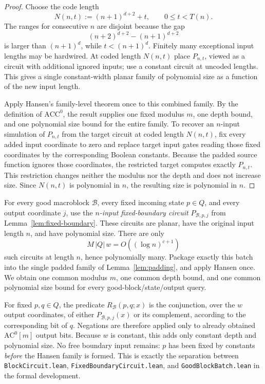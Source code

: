 \documentclass[11pt]{article}
\theoremstyle{definition}
\newcommand{\ACC}{\mathrm{ACC}^{0}}
\newcommand{\ACm}[1]{\mathrm{AC}^{0}[#1]}
\newcommand{\cB}{\mathcal{B}}
\begin{document}
\begin{proof}
Choose the code length
\[
  N(n,t):=(n+1)^{d+2}+t,
  \qquad 0\le t<T(n).
\]
The ranges for consecutive $n$ are disjoint because the gap
\[
  (n+2)^{d+2}-(n+1)^{d+2}
\]
is larger than $(n+1)^d$, while $t<(n+1)^d$.  Finitely many exceptional input lengths may be hardwired.  At coded length $N(n,t)$ place
$P_{n,t}$, viewed as a circuit with additional ignored inputs; use a constant
circuit at uncoded lengths.  This gives a single constant-width planar family
of polynomial size as a function of the new input length.

Apply Hansen's family-level theorem once to this combined family.  By the
definition of $\ACC$, the result supplies one fixed modulus $m$, one depth
bound, and one polynomial size bound for the entire family.  To recover an
$n$-input simulation of $P_{n,t}$ from the target circuit at coded length
$N(n,t)$, fix every added input coordinate to zero and replace target input
gates reading those fixed coordinates by the corresponding Boolean constants.
Because the padded source function ignores those coordinates, the restricted
target computes exactly $P_{n,t}$.  This restriction changes neither the
modulus nor the depth and does not increase size.  Since $N(n,t)$ is polynomial
in $n$, the resulting size is polynomial in $n$.
\end{proof}

For every good macroblock $\cB$, every fixed incoming state $p\in Q$, and
every output coordinate $j$, use the \emph{$n$-input fixed-boundary circuit}
$P_{\cB,p,j}$ from Lemma~\ref{lem:fixed-boundary}.  These circuits are planar,
have the original input length $n$, and have polynomial size.  There are only
\[
  M\,|Q|\,w=O((\log n)^{c+1})
\]
such circuits at length $n$, hence polynomially many.  Package exactly this
batch into the single padded family of Lemma~\ref{lem:padding}, and apply
Hansen once.  We obtain one common modulus $m$, one common depth bound, and one
common polynomial size bound for every good-block/state/output query.

For fixed $p,q\in Q$, the predicate $R_{\cB}(p,q;x)$ is the conjunction, over
the $w$ output coordinates, of either $P_{\cB,p,j}(x)$ or its complement,
according to the corresponding bit of $q$.  Negations are therefore applied
only to already obtained $\ACm{m}$ output bits.  Because $w$ is constant, this
adds only constant depth and polynomial size.  No free boundary input remains:
$p$ has been fixed by constants \emph{before} the Hansen family is formed.
This is exactly the separation between \texttt{BlockCircuit.lean},
\texttt{FixedBoundaryCircuit.lean}, and \texttt{GoodBlockBatch.lean} in the
formal development.
\end{document}
